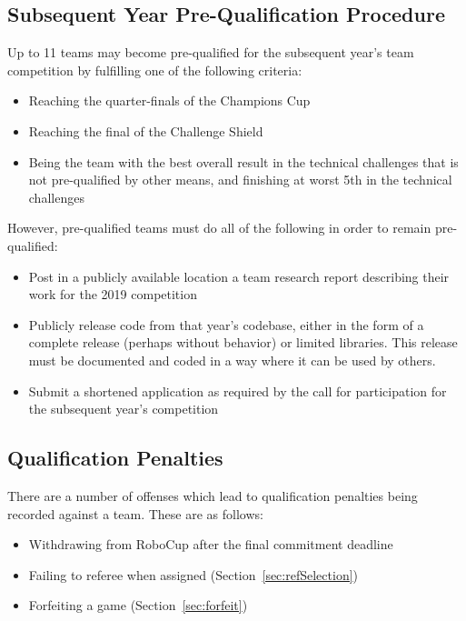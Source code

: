 \documentclass[12pt]{article}
\begin{document}
\subsection{Subsequent Year Pre-Qualification Procedure}
\label{sec:preQual}
Up to 11 teams may become pre-qualified for the subsequent year's team competition by fulfilling one of the following criteria:
\begin{itemize}
    \item Reaching the quarter-finals of the Champions Cup
    \item Reaching the final of the Challenge Shield
    \item Being the team with the best overall result in the technical challenges that is not pre-qualified by other means, and finishing at worst 5th in the technical challenges
\end{itemize}

However, pre-qualified teams must do all of the following in order to remain pre-qualified:
\begin{itemize}
\item Post in a publicly available location a team research report describing their work for the 2019 competition
\item Publicly release code from that year's codebase, either in the form of a complete release (perhaps without behavior) or limited libraries.  This release must be documented and coded in a way where it can be used by others.
\item Submit a shortened application as required by the call for participation for the subsequent year's competition
\end{itemize}

\subsection{Qualification Penalties}
\label{sec:qualificationPenalties}

There are a number of offenses which lead to qualification penalties being recorded against a team. These are as follows:
\begin{itemize}
    \item Withdrawing from RoboCup after the final commitment deadline
    \item Failing to referee when assigned (Section~\ref{sec:refSelection})
    \item Forfeiting a game (Section~\ref{sec:forfeit})
\end{itemize}
\end{document}
